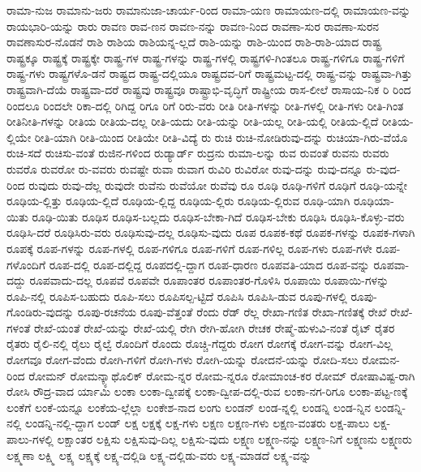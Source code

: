 {ರಾಮಾ-ನುಜ
ರಾಮಾನು-ಜರು
ರಾಮಾನುಜಾ-ಚಾರ್ಯ-ರಿಂದ
ರಾಮಾ-ಯಣ
ರಾಮಾಯಣ-ದಲ್ಲಿ
ರಾಮಾಯಣ-ವನ್ನು
ರಾಯಭಾರಿ-ಯನ್ನು
ರಾರು
ರಾವಣ
ರಾವ-ಣನ
ರಾವಣ-ನನ್ನು
ರಾವಣ-ನಿಂದ
ರಾವಣಾ-ಸುರ
ರಾವಣಾ-ಸುರನ
ರಾವಣಾಸುರ-ನೊಡನೆ
ರಾಶಿ
ರಾಶಿಯ
ರಾಶಿಯನ್ನ-ಲ್ಲದೆ
ರಾಶಿ-ಯನ್ನು
ರಾಶಿ-ಯಿಂದ
ರಾಶಿ-ರಾಶಿ-ಯಾದ
ರಾಷ್ಟ್ರ
ರಾಷ್ಟ್ರಕ್ಕೂ
ರಾಷ್ಟ್ರಕ್ಕೆ
ರಾಷ್ಟ್ರಕ್ಕೇ
ರಾಷ್ಟ್ರ-ಗಳ
ರಾಷ್ಟ್ರ-ಗಳನ್ನು
ರಾಷ್ಟ್ರ-ಗಳಲ್ಲಿ
ರಾಷ್ಟ್ರಗಳಿ-ಗಿಂತಲೂ
ರಾಷ್ಟ್ರ-ಗಳಿಗೂ
ರಾಷ್ಟ್ರ-ಗಳಿಗೆ
ರಾಷ್ಟ್ರ-ಗಳು
ರಾಷ್ಟ್ರಗಳೊ-ಡನೆ
ರಾಷ್ಟ್ರದ
ರಾಷ್ಟ್ರ-ದಲ್ಲಿಯೂ
ರಾಷ್ಟ್ರದವ-ರಿಗೆ
ರಾಷ್ಟ್ರಮಟ್ಟ-ದಲ್ಲಿ
ರಾಷ್ಟ್ರ-ವನ್ನು
ರಾಷ್ಟ್ರವಾ-ಗಿತ್ತು
ರಾಷ್ಟ್ರವಾಗಿ-ದೆಯೆ
ರಾಷ್ಟ್ರವಾ-ದರೆ
ರಾಷ್ಟ್ರವು
ರಾಷ್ಟ್ರವೂ
ರಾಷ್ಟ್ರಾಭಿ-ವೃದ್ಧಿಗೆ
ರಾಷ್ಟ್ರೀಯ
ರಾಸ-ಲೀಲೆ
ರಾಸಾಯ-ನಿಕ
ರಿ
ರಿಂದ
ರಿಂದಲೂ
ರಿಂದಲೇ
ರಿಕಾ-ದಲ್ಲಿ
ರಿಗಿದ್ದ
ರಿಗೂ
ರಿಗೆ
ರಿರು-ವರು
ರೀತಿ
ರೀತಿ-ಗಳನ್ನು
ರೀತಿ-ಗಳಲ್ಲಿ
ರೀತಿ-ಗಳು
ರೀತಿ-ಗಿಂತ
ರೀತಿನೀತಿ-ಗಳನ್ನು
ರೀತಿಯ
ರೀತಿಯ-ದಲ್ಲ
ರೀತಿ-ಯದು
ರೀತಿ-ಯನ್ನು
ರೀತಿ-ಯಲ್ಲ
ರೀತಿ-ಯಲ್ಲಿ
ರೀತಿಯ-ಲ್ಲಿದೆ
ರೀತಿಯ-ಲ್ಲಿಯೇ
ರೀತಿ-ಯಾಗಿ
ರೀತಿ-ಯಿಂದ
ರೀತಿಯೇ
ರೀತಿ-ವಿದ್ಯೆ
ರು
ರುಚಿ
ರುಚಿ-ನೋಡಿರುವು-ದನ್ನು
ರುಚಿಯಾ-ಗಿರು-ವೆಯೊ
ರುಚಿ-ಸದೆ
ರುಚಿಸು-ವಂತೆ
ರುಜಿನ-ಗಳಿಂದ
ರುಡ್ಯಾರ್ಡ್
ರುದ್ರನು
ರುಮಾ-ಲನ್ನು
ರುವ
ರುವಂತೆ
ರುವನು
ರುವರು
ರುವರೊ
ರುವರೋ
ರು-ವವರು
ರುವಷ್ಟೇ
ರುವಾ
ರುವಾಗ
ರುವಿರಿ
ರುವಿರೋ
ರುವು-ದನ್ನು
ರುವು-ದನ್ನೂ
ರು-ವುದ-ರಿಂದ
ರುವುದು
ರುವು-ದೆಲ್ಲ
ರುವುದೇ
ರುವೆನು
ರುವೆಯೋ
ರುವೆವು
ರೂ
ರೂಢಿ
ರೂಢಿ-ಗಳಿಗೆ
ರೂಢಿಗೆ
ರೂಢಿ-ಯನ್ನೇ
ರೂಢಿಯ-ಲ್ಲಿತ್ತು
ರೂಢಿಯ-ಲ್ಲಿದೆ
ರೂಢಿಯ-ಲ್ಲಿದ್ದ
ರೂಢಿಯ-ಲ್ಲಿರು
ರೂಢಿಯ-ಲ್ಲಿರುವ
ರೂಢಿ-ಯಾಗಿ
ರೂಢಿಯಾ-ಯಿತು
ರೂಢಿ-ಯಿತು
ರೂಢಿಸ
ರೂಢಿಸ-ಬಲ್ಲದು
ರೂಢಿಸ-ಬೇಕಾ-ಗಿದೆ
ರೂಢಿಸ-ಬೇಕು
ರೂಢಿಸಿ
ರೂಢಿಸಿ-ಕೊಳ್ಳು-ವರು
ರೂಢಿಸಿ-ದರೆ
ರೂಢಿಸಿರು-ವರು
ರೂಢಿಸುವು-ದಲ್ಲ
ರೂಢಿಸು-ವುದು
ರೂಪ
ರೂಪಕ-ಕಥೆ
ರೂಪಕ-ಗಳನ್ನು
ರೂಪಕ-ಗಳಾಗಿ
ರೂಪಕ್ಕೆ
ರೂಪ-ಗಳನ್ನು
ರೂಪ-ಗಳಲ್ಲಿ
ರೂಪ-ಗಳಿಗೂ
ರೂಪ-ಗಳಿಗೆ
ರೂಪ-ಗಳಿಲ್ಲ
ರೂಪ-ಗಳು
ರೂಪ-ಗಳೇ
ರೂಪ-ಗಳೊಂದಿಗೆ
ರೂಪ-ದಲ್ಲಿ
ರೂಪ-ದಲ್ಲಿದ್ದ
ರೂಪದಲ್ಲಿ-ದ್ದಾಗ
ರೂಪ-ಧಾರಣ
ರೂಪವತಿ-ಯಾದ
ರೂಪ-ವನ್ನು
ರೂಪವಾ-ದದ್ದು
ರೂಪವಾದು-ದಲ್ಲ
ರೂಪವೆ
ರೂಪವೇ
ರೂಪಾಂತರ
ರೂಪಾಂತರ-ಗೊಳಿಸಿ
ರೂಪಾಯಿ
ರೂಪಾಯಿ-ಗಳನ್ನು
ರೂಪಿ-ನಲ್ಲಿ
ರೂಪಿಸ-ಬಹುದು
ರೂಪಿ-ಸಲು
ರೂಪಿಸಲ್ಪ-ಟ್ಟಿದೆ
ರೂಪಿಸಿ
ರೂಪಿಸಿ-ಡುವ
ರೂಪು-ಗಳಲ್ಲಿ
ರೂಪು-ಗೊಂಡಿರು-ವುದನ್ನು
ರೂಪು-ರಚನೆಯ
ರೂಪು-ವೆತ್ತಂತೆ
ರೆಂದು
ರೆಡ್
ರೆಲ್ಲ
ರೇಖಾ-ಗಣಿತ
ರೇಖಾ-ಗಣಿತಕ್ಕೆ
ರೇಖೆ
ರೇಖೆ-ಗಳಂತೆ
ರೇಖೆ-ಯಂತೆ
ರೇಖೆ-ಯನ್ನು
ರೇಖೆ-ಯಲ್ಲಿ
ರೇಗಿ
ರೇಗಿ-ಹೋಗಿ
ರೇಚಕ
ರೇಷ್ಮೆ-ಹುಳುವಿ-ನಂತೆ
ರೈಟ್
ರೈತರ
ರೈತರು
ರೈಲಿ-ನಲ್ಲಿ
ರೈಲು
ರೈಲ್ವೆ
ರೊಂದಿಗೆ
ರೊಂದು
ರೊಚ್ಚಿ-ಗೆದ್ದರು
ರೋಗ
ರೋಗಕ್ಕೆ
ರೋಗ-ವನ್ನು
ರೋಗ-ವಿಲ್ಲ
ರೋಗವೂ
ರೋಗ-ವೆಂದು
ರೋಗಿ-ಗಳಿಗೆ
ರೋಗಿ-ಗಳು
ರೋಗಿ-ಯನ್ನು
ರೋದನೆ-ಯನ್ನು
ರೋದಿ-ಸಲು
ರೋಮನ-ರಿಂದ
ರೋಮನ್
ರೋಮನ್ಕ್ಯಾಥೊಲಿಕ್
ರೋಮ-ನ್ನರ
ರೋಮ-ನ್ನರೂ
ರೋಮಾಂಚ-ಕರ
ರೋಮ್
ರೋಷಾವಿಷ್ಟ-ರಾಗಿ
ರೋಸಿ
ರೌದ್ರ-ವಾದ
ರ್ಯಾಮಿ
ಲಂಕಾ
ಲಂಕಾ-ದ್ವೀಪಕ್ಕೆ
ಲಂಕಾ-ದ್ವೀಪ-ದಲ್ಲಿ-ರುವ
ಲಂಕಾ-ನಗ-ರಿಗೂ
ಲಂಕಾ-ಪಟ್ಟ-ಣಕ್ಕೆ
ಲಂಕೆಗೆ
ಲಂಕೆ-ಯನ್ನೂ
ಲಂಕೆಯ-ಲ್ಲೆಲ್ಲಾ
ಲಂಕೇಶ-ನಾದ
ಲಂಗು
ಲಂಡನ್
ಲಂಡ-ನ್ನಲ್ಲಿ
ಲಂಡನ್ನಿ
ಲಂಡ-ನ್ನಿನ
ಲಂಡನ್ನಿ-ನಲ್ಲಿ
ಲಂಡನ್ನಿ-ನಲ್ಲಿ-ದ್ದಾಗ
ಲಂಡ್
ಲಕ್ಷ
ಲಕ್ಷಕ್ಕೆ
ಲಕ್ಷ-ಗಳು
ಲಕ್ಷಣ
ಲಕ್ಷಣ-ಗಳು
ಲಕ್ಷಣ-ವಂತರು
ಲಕ್ಷ-ಪಾಲು
ಲಕ್ಷ-ಪಾಲು-ಗಳಲ್ಲಿ
ಲಕ್ಷಾಂತರ
ಲಕ್ಷಿಸು
ಲಕ್ಷಿಸುವು-ದಿಲ್ಲ
ಲಕ್ಷಿಸು-ವುದು
ಲಕ್ಷ್ಮಣ
ಲಕ್ಷ್ಮಣ-ನನ್ನು
ಲಕ್ಷ್ಮಣ-ನಿಗೆ
ಲಕ್ಷ್ಮಣನು
ಲಕ್ಷ್ಮಣರು
ಲಕ್ಷ್ಮಣಾ
ಲಕ್ಷ್ಮಿ
ಲಕ್ಷ್ಯ
ಲಕ್ಷ್ಯಕ್ಕೆ
ಲಕ್ಷ್ಯ-ದಲ್ಲಿಡಿ
ಲಕ್ಷ್ಯ-ದಲ್ಲಿಡು-ವರು
ಲಕ್ಷ್ಯ-ಮಾಡದೆ
ಲಕ್ಷ್ಯ-ವನ್ನು
}
